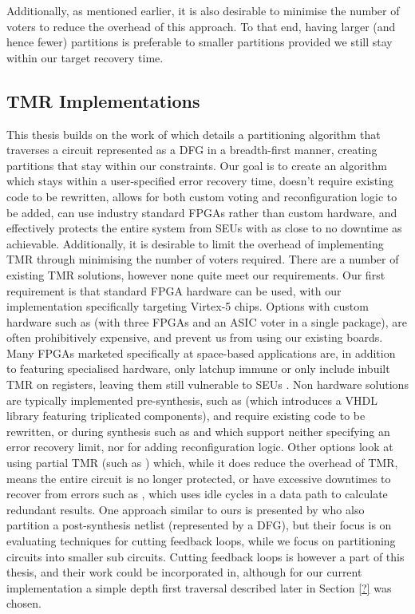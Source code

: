 \documentclass[12pt,final,oneside]{dwThesis} %
\begin{document}
   Additionally, as mentioned earlier, it is also desirable to minimise the
   number of voters to reduce the overhead of this approach. To that end,
   having larger (and hence fewer) partitions is preferable to smaller
   partitions provided we still stay within our target recovery time.

 \subsection{\gls{TMR} Implementations} This thesis builds on the
work of\cite{DiesselChange} which details a partitioning algorithm that
traverses a circuit represented as a \gls{DFG} in a breadth-first manner,
creating partitions that stay within our constraints.  Our goal is to create an
algorithm which stays within a user-specified error recovery time, doesn't
require existing code to be rewritten, allows for both custom voting and
reconfiguration logic to be added, can use industry standard \glspl{FPGA}
rather than custom hardware, and effectively protects the entire system from
\glspl{SEU} with as close to no downtime as achievable.  Additionally, it is
desirable to limit the overhead of implementing \gls{TMR} through minimising
the number of voters required.  There are a number of existing \gls{TMR}
solutions, however none quite meet our requirements.  Our first requirement is
that standard \gls{FPGA} hardware can be used, with our implementation
specifically targeting Virtex-5 chips. Options with custom hardware such as
\cite{VFPGATMR} (with three \glspl{FPGA} and an \gls{ASIC} voter in a single
package), are often prohibitively expensive, and prevent us from using our
existing boards.  Many \glspl{FPGA} marketed specifically at space-based
applications are, in addition to featuring specialised hardware, only
latchup immune or only include inbuilt \gls{TMR} on registers,
leaving them still vulnerable to \glspl{SEU} \cite{FPGAReview}.  Non hardware
solutions are typically implemented pre-synthesis, such as \cite{ftmr} (which
introduces a \gls{VHDL} library featuring triplicated components), and require
existing code to be rewritten, or during synthesis such as \cite{synplify} and
\cite{tmrtool} which support neither specifying an error recovery limit, nor
for adding reconfiguration logic.  Other options look at using partial
\gls{TMR} (such as \cite{partialTMR}) which, while it does reduce the overhead
of \gls{TMR}, means the entire circuit is no longer protected, or have
excessive downtimes to recover from errors such as \cite{VTMR}, which uses idle
cycles in a data path to calculate redundant results.  One approach similar to
ours is presented by \cite{PostSynth} who also partition a post-synthesis
netlist (represented by a \gls{DFG}), but their focus is on evaluating
techniques for cutting feedback loops, while we focus on partitioning circuits
into smaller sub circuits. Cutting feedback loops is however a part of this
thesis, and their work could be incorporated in, although for our current
implementation a simple depth first traversal described later in Section
\ref{?} was chosen.
\end{document}
